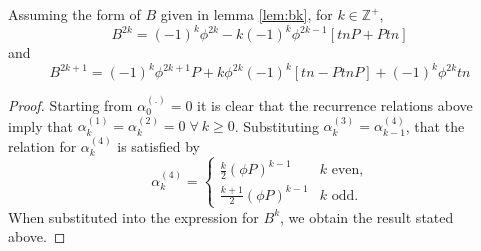 \begin{lemma}
\label{lem:bkexp}
Assuming the form of $B$ given in lemma \ref{lem:bk}, for 
$k\in \mathbb{Z}^{+}$,\[
B^{2k}=(-1)^k\phi^{2k}-k(-1)^k\phi^{2k-1}[tnP + Ptn]
\]and\[
B^{2k+1}=(-1)^k\phi^{2k+1}P + k \phi^{2k} (-1)^k [ tn - PtnP ] + (-1)^k\phi^{2k} tn
\]
\end{lemma}
\begin{proof}
Starting from $\alpha _{0}^{(.)}=0$ it is clear that the recurrence
relations above imply that $\alpha _{k}^{(1)}=\alpha _{k}^{(2)}=0\; \forall \: k \ge 0$.
Substituting $\alpha _{k}^{(3)}=\alpha _{k-1}^{(4)}$,
that the relation for $\alpha _{k}^{(4)}$ is satisfied by \[
\alpha _{k}^{(4)}=\begin{cases}
 \frac{k}{2}(\phi P)^{k-1} & k\textrm{ even,}\\
 \frac{k+1}{2}(\phi P)^{k-1} & k\textrm{ odd.}\end{cases}\]
When substituted into the expression for $B^{k}$, we obtain the
result stated above.
\end{proof}


